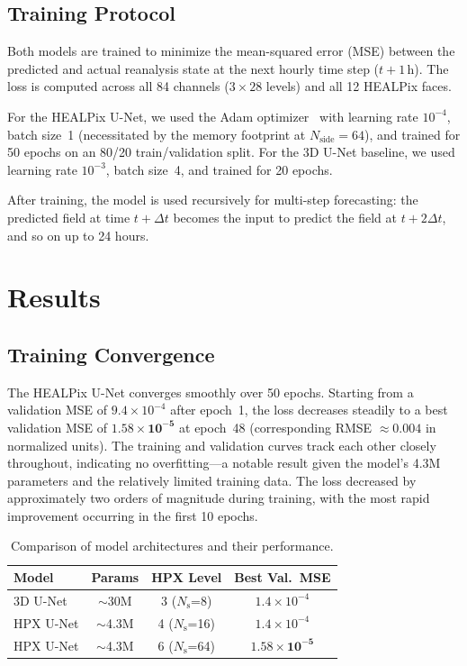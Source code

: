 \documentclass[11pt, a4paper, twocolumn]{article}
\begin{document}
\subsection{Training Protocol}

Both models are trained to minimize the mean-squared error (MSE) between the predicted and actual reanalysis state at the next hourly time step ($t + 1$\,h). The loss is computed across all 84 channels ($3 \times 28$ levels) and all 12 HEALPix faces.

For the HEALPix U-Net, we used the Adam optimizer~\cite{kingma2015adam} with learning rate $10^{-4}$, batch size~1 (necessitated by the memory footprint at $N_\text{side} = 64$), and trained for 50 epochs on an 80/20 train/validation split. For the 3D U-Net baseline, we used learning rate $10^{-3}$, batch size~4, and trained for 20 epochs.

After training, the model is used recursively for multi-step forecasting: the predicted field at time $t + \Delta t$ becomes the input to predict the field at $t + 2\Delta t$, and so on up to 24 hours.

\section{Results}

\subsection{Training Convergence}

The HEALPix U-Net converges smoothly over 50 epochs. Starting from a validation MSE of $9.4 \times 10^{-4}$ after epoch~1, the loss decreases steadily to a best validation MSE of $\mathbf{1.58 \times 10^{-5}}$ at epoch~48 (corresponding RMSE $\approx 0.004$ in normalized units). The training and validation curves track each other closely throughout, indicating no overfitting---a notable result given the model's 4.3M parameters and the relatively limited training data. The loss decreased by approximately two orders of magnitude during training, with the most rapid improvement occurring in the first 10 epochs.

\begin{table}[t]
\centering
\caption{Comparison of model architectures and their performance.}
\label{tab:comparison}
\small
\begin{tabular}{@{}lccc@{}}
\toprule
\textbf{Model} & \textbf{Params} & \textbf{HPX Level} & \textbf{Best Val.\ MSE} \\
\midrule
3D U-Net & ${\sim}$30M & 3 ($N_\text{s}$=8) & $1.4 \times 10^{-4}$ \\
HPX U-Net & ${\sim}$4.3M & 4 ($N_\text{s}$=16) & $1.4 \times 10^{-4}$ \\
HPX U-Net & ${\sim}$4.3M & 6 ($N_\text{s}$=64) & $\mathbf{1.58 \times 10^{-5}}$ \\
\bottomrule
\end{tabular}
\end{table}
\end{document}

